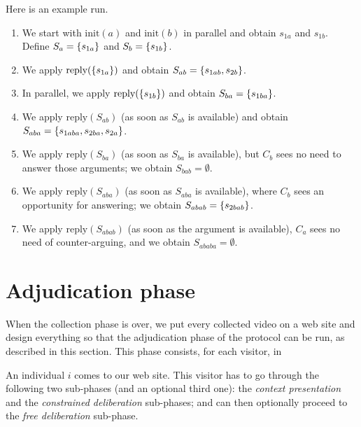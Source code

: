 \documentclass[version=3.21, pagesize, twoside=off, bibliography=totoc, DIV=calc, fontsize=12pt, a4paper]{scrartcl}
\begin{document}
\begin{example}
Here is an example run.
\begin{enumerate}
	\item We start with $\text{init}(a)$ and $\text{init}(b)$ in parallel and obtain $s_{1a}$ and $s_{1b}$. Define $S_{a} = \{s_{1a}\}$ and $S_{b} = \{s_{1b}\}$.
	\item We apply $\text{reply}(\{s_{1a}\})$ and obtain $S_{ab} = \{s_{1ab}, s_{2b}\}$.
	\item In parallel, we apply $\text{reply}(\{s_{1b}\})$ and obtain $S_{ba} = \{s_{1ba}\}$.
	\item We apply $\text{reply}(S_{ab})$ (as soon as $S_{ab}$ is available) and obtain $S_{aba} = \{s_{1aba}, s_{2ba}, s_{2a}\}$.
	\item We apply $\text{reply}(S_{ba})$ (as soon as $S_{ba}$ is available), but $C_b$ sees no need to answer those arguments; we obtain $S_{bab} = \emptyset$.
	\item We apply $\text{reply}(S_{aba})$ (as soon as $S_{aba}$ is available), where $C_b$ sees an opportunity for answering; we obtain $S_{abab} = \{s_{2bab}\}$.
	\item We apply $\text{reply}(S_{abab})$ (as soon as the argument is available), $C_a$ sees no need of counter-arguing, and we obtain $S_{ababa} = \emptyset$.
\end{enumerate}
\end{example}

\section{Adjudication phase}
When the collection phase is over, we put every collected video on a web site and design everything so that the adjudication phase of the protocol can be run, as described in this section. This phase consists, for each visitor, in 

An individual $i$ comes to our web site. This visitor has to go through the following two sub-phases (and an optional third one): the \emph{context presentation} and the \emph{constrained deliberation} sub-phases; and can then optionally proceed to the \emph{free deliberation} sub-phase.
\end{document}
